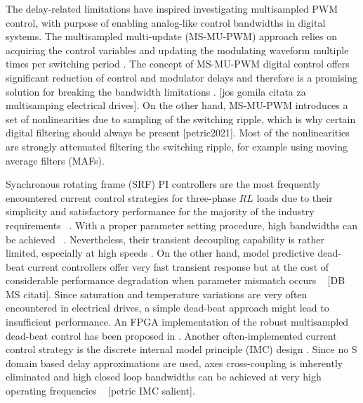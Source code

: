 \documentclass[journal]{IEEEtran}
\begin{document}
The delay-related limitations have inspired investigating multisampled PWM control, with purpose of enabling analog-like control bandwidths in digital systems. The multisampled multi-update (MS-MU-PWM) approach relies on acquiring the control variables and updating the modulating waveform multiple times per switching period \cite{corradini_analysis}. The concept of MS-MU-PWM digital control offers significant reduction of control and modulator delays and therefore is a promising solution for breaking the bandwidth limitations \cite{corradini2018}. [jos gomila citata za multisamping electrical drives]. On the other hand, MS-MU-PWM introduces a set of nonlinearities due to sampling of the switching ripple, which is why certain digital filtering should always be present [petric2021]. Most of the nonlinearities are strongly attenuated filtering the switching ripple, for example using moving average filters (MAFs).

Synchronous rotating frame (SRF) PI controllers are the most frequently encountered current control strategies for three-phase $RL$ loads due to their simplicity and satisfactory performance for the majority of the industry requirements ~\cite{rowan1986,bae2003,yepes2014}. With a proper parameter setting procedure, high bandwidths can be achieved ~\cite{yepes2014,holmes2009}. Nevertheless, their transient decoupling capability is rather limited, especially at high speeds \cite{lorenz2000}. On the other hand, model predictive dead-beat current controllers offer very fast transient response but at the cost of considerable performance degradation when parameter mismatch occurs ~\cite{malesani1999,xu2019} [DB MS citati]. Since saturation and temperature variations are very often encountered in electrical drives, a simple dead-beat approach might lead to insufficient performance. An FPGA implementation of the robust multisampled dead-beat control has been proposed in \cite{rovere2018}. Another often-implemented current control strategy is the discrete internal model principle (IMC) design \cite{lorenz2010}. Since no S domain based delay approximations are used, axes cross-coupling is inherently eliminated and high closed loop bandwidths can be achieved at very high operating frequencies ~\cite{commentsHoffmann,vuksa2016} [petric IMC salient].
\end{document}
